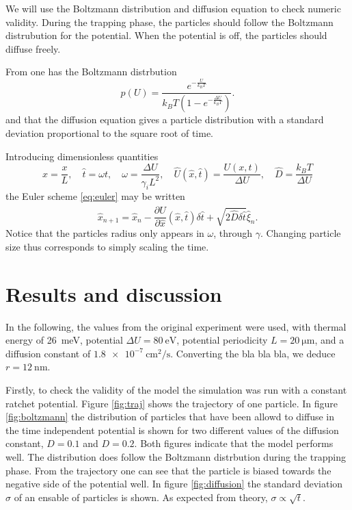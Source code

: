 \documentclass[a4paper, 12pt]{article}
\newcommand{\del}[2]{\frac{\partial #1}{\partial #2}}  %
\begin{document}
We will use the Boltzmann distribution and diffusion equation to check numeric validity.
During the trapping phase, the particles should follow the Boltzmann distrubution for the potential.
When the potential is off, the particles should diffuse freely.

From \cite{assignment} one has the Boltzmann distrbution
\begin{equation}\label{eq:boltzmann}
p(U) =
\frac{
  e^{-\frac{U}{k_BT}}
}{
  k_BT \left(
  1 - e^{-\frac{\Delta U}{k_BT}}
  \right)
}.
\end{equation} and that the diffusion equation gives a particle distribution with a standard deviation proportional to the square root of time.

Introducing dimensionless quantities
\begin{equation}\label{eq:dimless}
\hat{x} = \frac{x}{L},\quad
\hat{t} = \omega t,\quad
\omega = \frac{\Delta U}{\gamma_i L^2},\quad
\hat{U}(\hat{x}, \hat{t}) = \frac{U(x, t)}{\Delta U},\quad
\hat{D} = \frac{k_BT}{\Delta U}
\end{equation}
the Euler scheme \eqref{eq:euler} may be written
\begin{equation}\label{eq:euler_dimless}
\hat{x}_{n+1} = \hat{x}_n - \del{\hat{U}}{\hat{x}}(\hat{x}, \hat{t})\delta \hat{t} + \sqrt{2\hat{D}\delta\hat{t}} \hat{\xi}_n.
\end{equation}
Notice that the particles radius only appears in $\omega$, through $\gamma$.
Changing particle size thus corresponds to simply scaling the time.

\section{Results and discussion}
In the following, the values from the original experiment were used, with thermal energy of \SI{26}{\milli\eV}, potential $\Delta U = \SI{80}{\eV}$, potential periodicity $L=\SI{20}{\micro\meter}$, and a diffusion constant of $\SI{1.8e-7}{\cm\squared\per\second}$.
Converting the bla bla bla, we deduce $r=\SI{12}{\nano\meter}$.

Firstly, to check the validity of the model the simulation was run with a constant ratchet potential.
Figure \ref{fig:traj} shows the trajectory of one particle.
In figure \ref{fig:boltzmann} the distribution of particles that have been allowd to diffuse in the time independent potential is shown for two different values of the diffusion constant, $D=0.1$ and $D = 0.2$.
Both figures indicate that the model performs well.
The distribution does follow the Boltzmann distrbution during the trapping phase.
From the trajectory one can see that the particle is biased towards the negative side of the potential well.
In figure \ref{fig:diffusion} the standard deviation $\sigma$ of an ensable of particles is shown.
As expected from theory, $\sigma \propto \sqrt{t}$.
\end{document}
